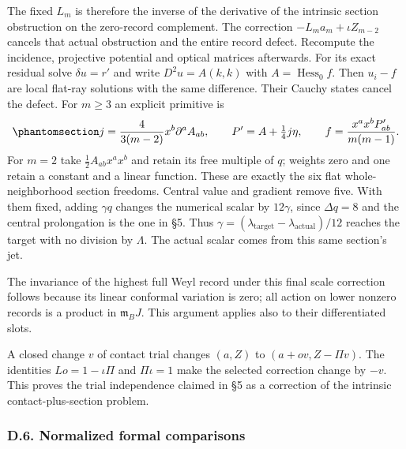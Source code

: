 \documentclass[
  english,
  11pt,
  reqno]{amsart}
\begin{document}
The fixed \(L_m\) is therefore the inverse of the derivative of the
intrinsic section obstruction on the zero-record complement. The
correction \(-L_ma_m+\iota Z_{m-2}\) cancels that actual obstruction and
the entire record defect. Recompute the incidence, projective potential
and optical matrices afterwards. For its exact residual solve
\(\delta u=r'\) and write \(D^2u=A(k,k)\) with
\(A=\operatorname{Hess}_0f\). Then \(u_i-f\) are local flat-ray
solutions with the same difference. Their Cauchy states cancel the
defect. For \(m\ge3\) an explicit primitive is
\begin{equation}\protect\phantomsection\label{eq:gg-app-exact-section-primitive}{
 j=\frac4{3(m-2)}x^b\partial^aA_{ab},\qquad
 P'=A+\tfrac14j\eta,\qquad
 f=\frac{x^ax^bP'_{ab}}{m(m-1)}.
}\end{equation} For \(m=2\) take \(\frac12A_{ab}x^ax^b\) and retain its
free multiple of \(q\); weights zero and one retain a constant and a
linear function. These are exactly the six flat whole-neighborhood
section freedoms. Central value and gradient remove five. With them
fixed, adding \(\gamma q\) changes the numerical scalar by \(12\gamma\),
since \(\Delta q=8\) and the central prolongation is the one in §5. Thus
\(\gamma=(\lambda_{\mathrm{target}}-\lambda_{\mathrm{actual}})/12\)
reaches the target with no division by \(\Lambda\). The actual scalar
comes from this same section's jet.

The invariance of the highest full Weyl record under this final scale
correction follows because its linear conformal variation is zero; all
action on lower nonzero records is a product in \(\mathfrak m_BJ\). This
argument applies also to their differentiated slots.

A closed change \(v\) of contact trial changes \((a,Z)\) to
\((a+ov,Z-\Pi v)\). The identities \(Lo=1-\iota\Pi\) and \(\Pi\iota=1\)
make the selected correction change by \(-v\). This proves the trial
independence claimed in §5 as a correction of the intrinsic
contact-plus-section problem.

\protect{}\label{sec:gg-optical-normalized-comparisons}

\subsubsection{D.6. Normalized formal
comparisons}\label{d.6.-normalized-formal-comparisons}
\end{document}
